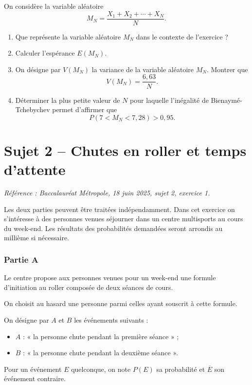 \documentclass[11pt,a4paper]{article}
\begin{document}
\begin{enumerate}
  On considère la variable aléatoire
  \[
  M_N=\dfrac{X_1+X_2+\cdots+X_N}{N}.
  \]
  \begin{enumerate}
    \item Que représente la variable aléatoire $M_N$ dans le contexte de l'exercice ?
    \item Calculer l'espérance $E(M_N)$.
    \item On désigne par $V(M_N)$ la variance de la variable aléatoire $M_N$. Montrer que
    \[
    V(M_N)=\dfrac{6{,}63}{N}.
    \]
    \item Déterminer la plus petite valeur de $N$ pour laquelle l'inégalité de Bienaymé-Tchebychev permet d'affirmer que
    \[
    P(7<M_N<7{,}28)>0{,}95.
    \]
  \end{enumerate}
\end{enumerate}

\newpage

\section*{Sujet 2 -- Chutes en roller et temps d'attente}
{\small\emph{Référence : Baccalauréat Métropole, 18 juin 2025, sujet 2, exercice 1.}}

Les deux parties peuvent être traitées indépendamment. Dans cet exercice on s'intéresse à des personnes venues séjourner dans un centre multisports au cours du week-end. Les résultats des probabilités demandées seront arrondis au millième si nécessaire.

\subsubsection*{Partie A}

Le centre propose aux personnes venues pour un week-end une formule d'initiation au roller composée de deux séances de cours.

On choisit au hasard une personne parmi celles ayant souscrit à cette formule.

On désigne par $A$ et $B$ les événements suivants :
\begin{itemize}
  \item $A$ : « la personne chute pendant la première séance » ;
  \item $B$ : « la personne chute pendant la deuxième séance ».
\end{itemize}

Pour un événement $E$ quelconque, on note $P(E)$ sa probabilité et $\overline E$ son événement contraire.
\end{document}
